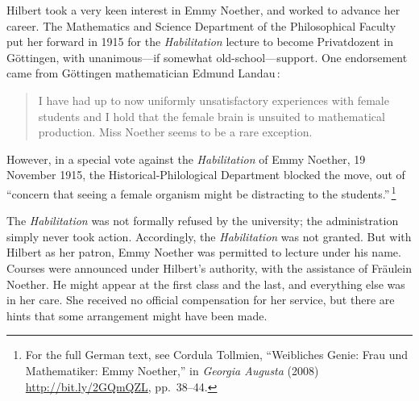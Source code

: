 \documentclass[twoside,symmetric]{tufte-handout}
\begin{document}
Hilbert took a very keen interest in Emmy Noether, and worked to advance her career.
The Mathematics and Science Department of the Philosophical Faculty put her forward in 1915 for the \emph{Habilitation} lecture to become Privatdozent in G\"ottingen, with unanimous---if somewhat old-school---support. One endorsement came from G\"ottingen mathematician Edmund Landau$\,$\cite{Schappa}:
\begin{quote}
I have had up to now uniformly unsatisfactory experiences with female students and I hold that the female brain is unsuited to mathematical production. Miss Noether seems to be a rare exception.
\end{quote}
However, in a special vote against the \emph{Habilitation} of Emmy Noether, 19 November 1915, the Historical-Philological Department blocked the move, out of ``concern that seeing a female organism might be distracting to the students.''$\,$\footnote{For the full German text, see Cordula Tollmien, ``Weibliches Genie: Frau und Mathematiker: Emmy Noether,'' in \emph{Georgia Augusta} (2008) \url{http://bit.ly/2GQmQZL}, pp.~38--44.}


The \emph{Habilitation} was not formally refused by the university; the administration simply never took action.
Accordingly, the \emph{Habilitation} was not granted. But with Hilbert as her patron, Emmy Noether was  permitted to lecture under his name. Courses were announced under Hilbert's authority, with the assistance of Fr\"aulein Noether. He might appear at the first class and the last, and everything else was in her care. She received no official compensation for her service, but there are hints that some arrangement might have been made.
\end{document}

